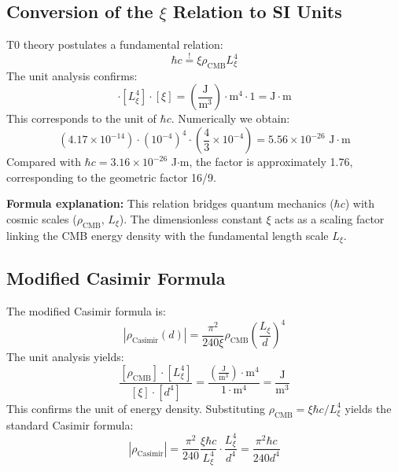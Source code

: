 	\subsection{Conversion of the $\xi$ Relation to SI Units}
	T0 theory postulates a fundamental relation:
	\begin{equation}
		\hbar c \stackrel{!}{=} \xi \rho_{\text{CMB}} L_\xi^4
	\end{equation}
	The unit analysis confirms:
	\begin{equation}
		[\rho_{\text{CMB}}] \cdot [L_\xi^4] \cdot [\xi] = \left( \frac{\text{J}}{\text{m}^3} \right) \cdot \text{m}^4 \cdot 1 = \text{J} \cdot \text{m}
	\end{equation}
	This corresponds to the unit of $\hbar c$. Numerically we obtain:
	\begin{equation}
		\left( 4.17 \times 10^{-14} \right) \cdot \left( 10^{-4} \right)^4 \cdot \left( \frac{4}{3} \times 10^{-4} \right) = 5.56 \times 10^{-26} \text{ J} \cdot \text{m}
	\end{equation}
	Compared with $\hbar c = 3.16 \times 10^{-26}$ J$\cdot$m, the factor is approximately 1.76, corresponding to the geometric factor 16/9.
	
	\textbf{Formula explanation:} This relation bridges quantum mechanics ($\hbar c$) with cosmic scales ($\rho_{\text{CMB}}$, $L_\xi$). The dimensionless constant $\xi$ acts as a scaling factor linking the CMB energy density with the fundamental length scale $L_\xi$.
	
	\subsection{Modified Casimir Formula}
	The modified Casimir formula is:
	\begin{equation}
		|\rho_{\text{Casimir}}(d)| = \frac{\pi^2}{240 \xi} \rho_{\text{CMB}} \left( \frac{L_\xi}{d} \right)^4
	\end{equation}
	The unit analysis yields:
	\begin{equation}
		\frac{[\rho_{\text{CMB}}] \cdot [L_\xi^4]}{[\xi] \cdot [d^4]} = \frac{\left( \frac{\text{J}}{\text{m}^3} \right) \cdot \text{m}^4}{1 \cdot \text{m}^4} = \frac{\text{J}}{\text{m}^3}
	\end{equation}
	This confirms the unit of energy density. Substituting $\rho_{\text{CMB}} = \xi \hbar c / L_\xi^4$ yields the standard Casimir formula:
	\begin{equation}
		|\rho_{\text{Casimir}}| = \frac{\pi^2}{240} \frac{\xi \hbar c}{L_\xi^4} \cdot \frac{L_\xi^4}{d^4} = \frac{\pi^2 \hbar c}{240 d^4}
	\end{equation}
	
